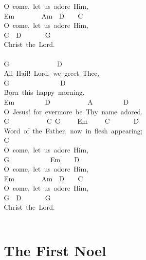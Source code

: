 \documentclass[]{book}
\let\stdsection\section
\renewcommand\section{\clearpage\stdsection}
\begin{document}
O~come,~let~us~adore~Him,\\
\hspace*{0.333em}\hspace*{0.333em}Em~~~~~~~~Am~~D~~~~C\\
O~come,~let~us~adore~Him,\\
G~~D~~~~~~~G\\
Christ~the~Lord.\\
~\\
\hspace*{0.333em}\hspace*{0.333em}\hspace*{0.333em}\hspace*{0.333em}G~~~~~~~~~~~~~~D\\
All~Hail!~Lord,~we~greet~Thee,\\
G~~~~~~~~~~~~~~~D\\
Born~this~happy~morning,\\
\hspace*{0.333em}\hspace*{0.333em}Em~~~~~~~~~D~~~~~~~~~~~A~~~~~~~~~D\\
O~Jesus!~for~evermore~be~Thy~name~adored.\\
G~~~~~~~~~~~C~G~~~~~Em~~~~~C~~~~~~~D\\
Word~of~the~Father,~now~in~flesh~appearing;\\
\hspace*{0.333em}\hspace*{0.333em}G\\
O~come,~let~us~adore~Him,\\
\hspace*{0.333em}\hspace*{0.333em}G~~~~~~~~~~~~Em~~~~D\\
O~come,~let~us~adore~Him,\\
\hspace*{0.333em}\hspace*{0.333em}Em~~~~~~~~Am~~D~~~~C\\
O~come,~let~us~adore~Him,\\
G~~D~~~~~~~G\\
Christ~the~Lord.\\
~\\

\hypertarget{the-first-noel}{%
\section{The First Noel}\label{the-first-noel}}
\end{document}
